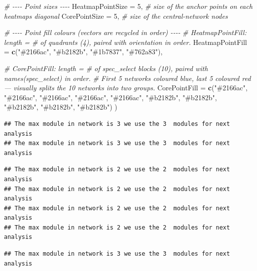 \documentclass[
]{book}
\newenvironment{Shaded}{\begin{snugshade}}{\end{snugshade}}
\newcommand{\AttributeTok}[1]{\textcolor[rgb]{0.13,0.29,0.53}{#1}}
\newcommand{\CommentTok}[1]{\textcolor[rgb]{0.56,0.35,0.01}{\textit{#1}}}
\newcommand{\DecValTok}[1]{\textcolor[rgb]{0.00,0.00,0.81}{#1}}
\newcommand{\FunctionTok}[1]{\textcolor[rgb]{0.13,0.29,0.53}{\textbf{#1}}}
\newcommand{\NormalTok}[1]{#1}
\newcommand{\StringTok}[1]{\textcolor[rgb]{0.31,0.60,0.02}{#1}}
\begin{document}
\begin{Shaded}
\begin{Highlighting}[]
  \CommentTok{\# {-}{-}{-}{-} Point sizes {-}{-}{-}{-}}
  \AttributeTok{HeatmapPointSize   =} \DecValTok{5}\NormalTok{,                    }\CommentTok{\# size of the anchor points on each heatmap\textquotesingle{}s diagonal}
  \AttributeTok{CorePointSize      =} \DecValTok{5}\NormalTok{,                    }\CommentTok{\# size of the central{-}network nodes}

  \CommentTok{\# {-}{-}{-}{-} Point fill colours (vectors are recycled in order) {-}{-}{-}{-}}
  \CommentTok{\# HeatmapPointFill: length = \# of quadrants (4), paired with \textasciigrave{}orientation\textasciigrave{} in order.}
  \AttributeTok{HeatmapPointFill   =} \FunctionTok{c}\NormalTok{(}\StringTok{"\#2166ac"}\NormalTok{, }\StringTok{"\#b2182b"}\NormalTok{, }\StringTok{"\#1b7837"}\NormalTok{, }\StringTok{"\#762a83"}\NormalTok{),}

  \CommentTok{\# CorePointFill: length = \# of spec\_select blocks (10), paired with names(spec\_select) in order.}
  \CommentTok{\# First 5 networks coloured blue, last 5 coloured red — visually splits the 10 networks into two groups.}
  \AttributeTok{CorePointFill      =} \FunctionTok{c}\NormalTok{(}\StringTok{"\#2166ac"}\NormalTok{, }\StringTok{"\#2166ac"}\NormalTok{, }\StringTok{"\#2166ac"}\NormalTok{, }\StringTok{"\#2166ac"}\NormalTok{,}
                         \StringTok{"\#2166ac"}\NormalTok{, }\StringTok{"\#b2182b"}\NormalTok{, }\StringTok{"\#b2182b"}\NormalTok{, }\StringTok{"\#b2182b"}\NormalTok{,}
                         \StringTok{"\#b2182b"}\NormalTok{, }\StringTok{"\#b2182b"}\NormalTok{)}
\NormalTok{)}
\end{Highlighting}
\end{Shaded}

\begin{verbatim}
## The max module in network is 3 we use the 3  modules for next analysis
## The max module in network is 3 we use the 3  modules for next analysis
\end{verbatim}

\begin{verbatim}
## The max module in network is 2 we use the 2  modules for next analysis
## The max module in network is 2 we use the 2  modules for next analysis
## The max module in network is 2 we use the 2  modules for next analysis
## The max module in network is 2 we use the 2  modules for next analysis
\end{verbatim}

\begin{verbatim}
## The max module in network is 3 we use the 3  modules for next analysis
\end{verbatim}
\end{document}

